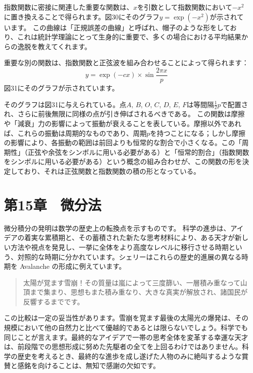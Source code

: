 \documentclass[a4paper,11pt,openany]{ltjsbook}
\begin{document}
指数関数に密接に関連した重要な関数は、$x$を引数として指数関数において$-x^2$に置き換えることで得られます。図30にそのグラフ$y = \exp(-x^2)$が示されています。
この曲線は「正規誤差の曲線」と呼ばれ、帽子のような形をしており、これは統計学理論にとって生身的に重要で、多くの場合における平均結果からの逸脱を教えてくれます。

重要な別の関数は、指数関数と正弦波を組み合わせることによって得られます：
\[
y = \exp(-cx) × \sin \frac{2\pi x}{p}
\]
図31にそのグラフが示されています。

そのグラフは図31に与えられている。点$A$, $B$, $O$, $C$, $D$, $E$, $F$は等間隔$\frac{1}{2}p$で配置され、さらに前後無限に同様の点が引き伸ばされるべきである。
この関数は摩擦や「減衰」力の影響によって振動が衰えることを表している。摩擦以外であれば、これらの振動は周期的なものであり、周期$p$を持つことになる；しかし摩擦の影響により、各振動の範囲は前回よりも恒常的な割合で小さくなる。この「周期性」（正弦や余弦をシンボルに用いる必要がある）と「恒常的割合」（指数関数をシンボルに用いる必要がある）という概念の組み合わせが、この関数の形を決定しており、それは正弦関数と指数関数の積の形となっている。

\chapter{第15章　微分法}

微分積分の発明は数学の歴史上の転換点を示すものです。
科学の進歩は、アイデアの着実な累積期と、その蓄積された新たな思考材料により、ある天才が新しい方法や視点を発見し、一挙に全体をより高度なレベルに移行させる時期という、対照的な時期に分かれています。シェリーはこれらの歴史的進展の異なる時期を Avalanche の形成に例えています。

\begin{verse}
\footnotesize

太陽が覚ます雪崩！その質量は嵐によって三度篩い、一層積み重なって山頂まで集まり、思想もまた積み重なり、大きな真実が解放され、諸国民が反響するまでです。\\
\dotfill
\end{verse}

この比較は一定の妥当性があります。雪崩を覚ます最後の太陽光の爆発は、その規模において他の自然力と比べて優越的であるとは限らないでしょう。科学でも同じことが言えます。最終的なアイデアで一帯の思考全体を変革する幸運な天才は、前段階での思想形成に努めた先駆者の全てを上回るわけではありません。科学の歴史を考えるとき、最終的な進歩を成し遂げた人物のみに絶叫するような賞賛と感銘を向けることは、無知で感謝の欠如です。
\end{document}
